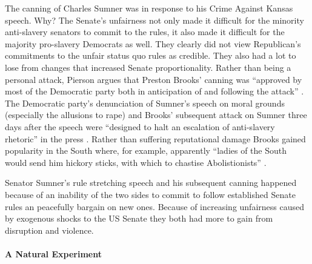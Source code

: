 \documentclass[a4paper]{article}\usepackage[]{graphicx}\usepackage[]{color}
\begin{document}
The canning of Charles Sumner was in response to his Crime Against Kansas speech. Why? The Senate's unfairness not only made it difficult for the minority anti-slavery senators to commit to the rules, it also made it difficult for the majority pro-slavery Democrats as well. They clearly did not view Republican's commitments to the unfair status quo rules as credible. They also had a lot to lose from changes that increased Senate proportionality. Rather than being a personal attack, Pierson argues that Preston Brooks' canning was ``approved by most of the Democratic party both in anticipation of and following the attack'' \cite[553]{Pierson1995}. The Democratic party's denunciation of Sumner's speech on moral grounds (especially the allusions to rape) and Brooks' subsequent attack on Sumner three days after the speech were ``designed to halt an escalation of anti-slavery rhetoric'' in the press \cite[553]{Pierson1995}. Rather than suffering reputational damage Brooks gained popularity in the South where, for example, apparently ``ladies of the South would send him hickory sticks, with which to chastise Abolistionists'' \cite[255]{Donald2009}.  

Senator Sumner's rule stretching speech and his subsequent canning happened because of an inability of the two sides to commit to follow established Senate rules an peacefully bargain on new ones. Because of increasing unfairness caused by exogenous shocks to the US Senate they both had more to gain from disruption and violence. 

\paragraph{A Natural Experiment}
\end{document}
